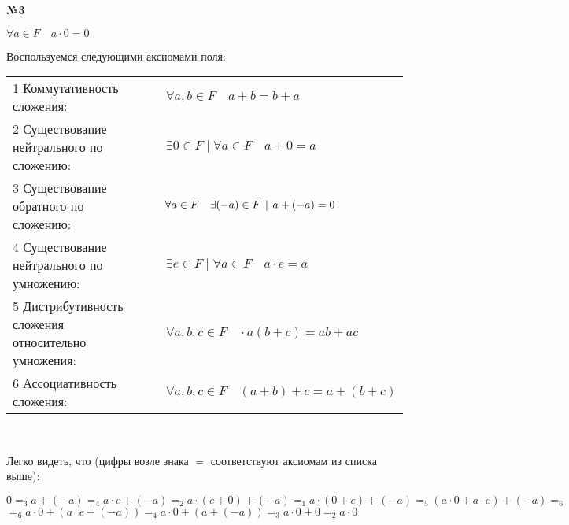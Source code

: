 \documentclass{article}
\newenvironment{task}{\begin{center}\fontsize{14}{14}\selectfont\bf}{\rm\fontsize{12}{12}\selectfont\end{center}}
\begin{document}

	\begin{task} 
		№3
	\end{task}
	\begin{center}
		$\forall a \in F \quad a\cdot 0 = 0$
	\end{center}
	Воспользуемся следующими аксиомами поля:
	\begin{center}
		\begin{tabular}{ll}
		1 Коммутативность сложения: & $\quad \forall a, b \in F \quad a+ b = b+ a$\\
		2 Существование нейтрального по сложению: & $\quad\exists 0 \in F \mid \forall a \in F \quad a + 0 = a$\\
		3 Существование обратного по сложению:& $\quad\forall a \in F \quad\exists (-a) \in F \hspace{4px}|\hspace{4px} a + (-a) = 0 $\\ 
		4 Существование нейтрального по умножению: & $\quad\exists e \in F \mid \forall a \in F \quad a \cdot e = a$\\
		5 Дистрибутивность сложения относительно умножения: & $\quad\forall a, b, c \in F \quad \cdot a(b+c) = ab + ac$ \\
		6 Ассоциативность сложения: & $\quad\forall a, b, c \in F \quad (a+b)+c=a+(b+c)$
		\end{tabular} \\
	\end{center}
	Легко видеть, что (цифры возле знака $=$ соответствуют аксиомам из списка выше):
	\begin{center}
		$0 =_3 a + (-a) =_4 a\cdot e + (-a) =_2 a\cdot(e + 0) + (-a) =_1 a\cdot(0 + e) + (-a) =_5 (a\cdot 0 + a\cdot e) + (-a) =_6 $ \\ $=_6 a\cdot0 + (a\cdot e + (-a)) =_4 a\cdot 0 + (a + (-a)) =_3 a\cdot 0 + 0 =_2 a\cdot 0$
	\end{center}

\end{document}
